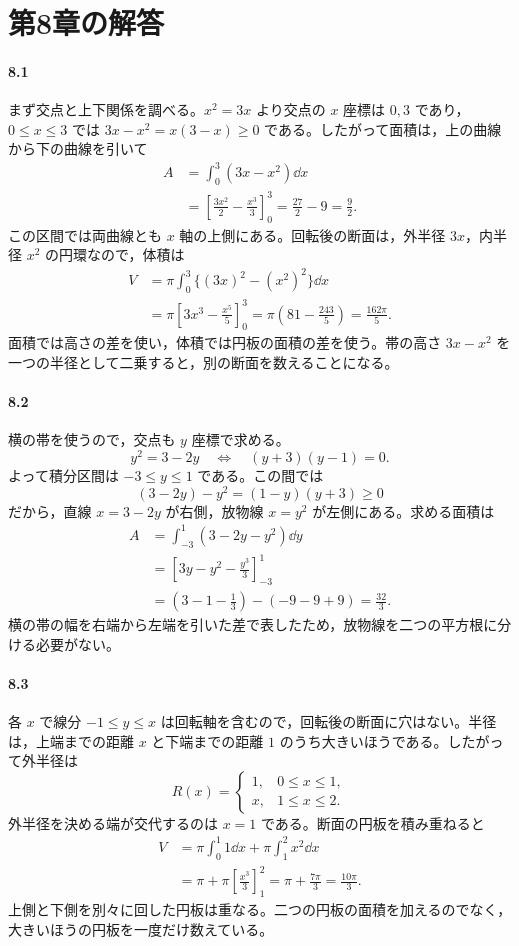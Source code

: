 \section{第8章の解答}\label{解答:第8章}

\paragraph{8.1}
まず交点と上下関係を調べる。$x^2=3x$ より交点の $x$ 座標は $0,3$ であり，$0\leq x\leq3$ では $3x-x^2=x(3-x)\geq0$ である。したがって面積は，上の曲線から下の曲線を引いて
\[
\begin{aligned}
A&=\int_0^3(3x-x^2)\dd x\\
 &=\left[\frac{3x^2}{2}-\frac{x^3}{3}\right]_0^3
 =\frac{27}{2}-9=\frac92.
\end{aligned}
\]
この区間では両曲線とも $x$ 軸の上側にある。回転後の断面は，外半径 $3x$，内半径 $x^2$ の円環なので，体積は
\[
\begin{aligned}
V&=\pi\int_0^3\{(3x)^2-(x^2)^2\}\dd x\\
 &=\pi\left[3x^3-\frac{x^5}{5}\right]_0^3
 =\pi\left(81-\frac{243}{5}\right)
 =\frac{162\pi}{5}.
\end{aligned}
\]
面積では高さの差を使い，体積では円板の面積の差を使う。帯の高さ $3x-x^2$ を一つの半径として二乗すると，別の断面を数えることになる。

\paragraph{8.2}
横の帯を使うので，交点も $y$ 座標で求める。
\[
y^2=3-2y
\quad\Longleftrightarrow\quad
(y+3)(y-1)=0.
\]
よって積分区間は $-3\leq y\leq1$ である。この間では
\[
(3-2y)-y^2=(1-y)(y+3)\geq0
\]
だから，直線 $x=3-2y$ が右側，放物線 $x=y^2$ が左側にある。求める面積は
\[
\begin{aligned}
A&=\int_{-3}^1(3-2y-y^2)\dd y\\
 &=\left[3y-y^2-\frac{y^3}{3}\right]_{-3}^1\\
 &=\left(3-1-\frac13\right)-(-9-9+9)
 =\frac{32}{3}.
\end{aligned}
\]
横の帯の幅を右端から左端を引いた差で表したため，放物線を二つの平方根に分ける必要がない。

\paragraph{8.3}
各 $x$ で線分 $-1\leq y\leq x$ は回転軸を含むので，回転後の断面に穴はない。半径は，上端までの距離 $x$ と下端までの距離 $1$ のうち大きいほうである。したがって外半径は
\[
R(x)=
\begin{cases}
1,&0\leq x\leq1,\\
x,&1\leq x\leq2.
\end{cases}
\]
外半径を決める端が交代するのは $x=1$ である。断面の円板を積み重ねると
\[
\begin{aligned}
V&=\pi\int_0^1 1\dd x+\pi\int_1^2 x^2\dd x\\
 &=\pi+\pi\left[\frac{x^3}{3}\right]_1^2
 =\pi+\frac{7\pi}{3}=\frac{10\pi}{3}.
\end{aligned}
\]
上側と下側を別々に回した円板は重なる。二つの円板の面積を加えるのでなく，大きいほうの円板を一度だけ数えている。

